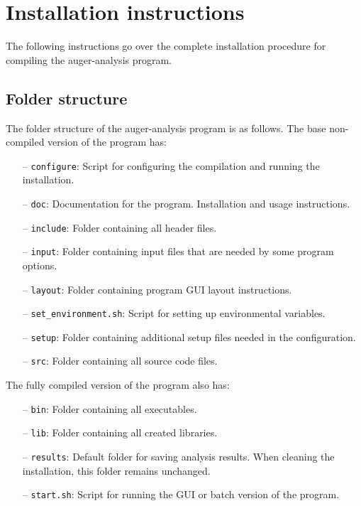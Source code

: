 \documentclass[12pt,a4paper]{report}
\begin{document}

\chapter{Installation instructions}
The following instructions go over the complete installation procedure for compiling the auger-analysis program.

\section{Folder structure}
The folder structure of the auger-analysis program is as follows. The base non-compiled version of the program has:
\begin{itemize}
\item[--] \texttt{configure}: Script for configuring the compilation and running the installation.
\item[--] \texttt{doc}: Documentation for the program. Installation and usage instructions.
\item[--] \texttt{include}: Folder containing all header files.
\item[--] \texttt{input}: Folder containing input files that are needed by some program options.
\item[--] \texttt{layout}: Folder containing program GUI layout instructions.
\item[--] \texttt{set\_environment.sh}: Script for setting up environmental variables.
\item[--] \texttt{setup}: Folder containing additional setup files needed in the configuration.
\item[--] \texttt{src}: Folder containing all source code files.
\end{itemize}
The fully compiled version of the program also has:
\begin{itemize}
\item[--] \texttt{bin}: Folder containing all executables.
\item[--] \texttt{lib}: Folder containing all created libraries.
\item[--] \texttt{results}: Default folder for saving analysis results. When cleaning the installation, this folder remains unchanged.
\item[--] \texttt{start.sh}: Script for running the GUI or batch version of the program.
\end{itemize}
\end{document}
